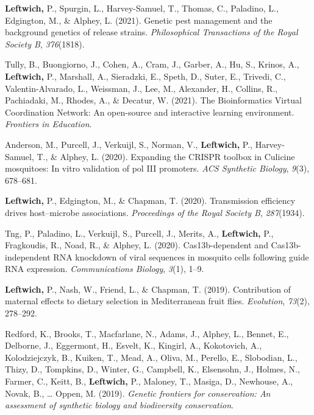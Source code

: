 \documentclass[11pt, a4paper]{awesome-cv}
\begin{document}
\leavevmode\hypertarget{ref-13}{}%
\textbf{Leftwich,} P., Spurgin, L., Harvey-Samuel, T., Thomas, C.,
Paladino, L., Edgington, M., \& Alphey, L. (2021). Genetic pest
management and the background genetics of release strains.
\emph{Philosophical Transactions of the Royal Society B},
\emph{376}(1818).

\leavevmode\hypertarget{ref-20}{}%
Tully, B., Buongiorno, J., Cohen, A., Cram, J., Garber, A., Hu, S.,
Krinos, A., \textbf{Leftwich,} P., Marshall, A., Sieradzki, E., Speth,
D., Suter, E., Trivedi, C., Valentin-Alvarado, L., Weissman, J., Lee,
M., Alexander, H., Collins, R., Pachiadaki, M., Rhodes, A., \& Decatur,
W. (2021). The {Bioinformatics} {Virtual} {Coordination} {Network}: An
open-source and interactive learning environment. \emph{Frontiers in
Education}.

\leavevmode\hypertarget{ref-11}{}%
Anderson, M., Purcell, J., Verkuijl, S., Norman, V., \textbf{Leftwich,}
P., Harvey-Samuel, T., \& Alphey, L. (2020). Expanding the CRISPR
toolbox in {Culicine} mosquitoes: In vitro validation of pol III
promoters. \emph{ACS Synthetic Biology}, \emph{9}(3), 678--681.

\leavevmode\hypertarget{ref-14}{}%
\textbf{Leftwich,} P., Edgington, M., \& Chapman, T. (2020).
Transmission efficiency drives host--microbe associations.
\emph{Proceedings of the Royal Society B}, \emph{287}(1934).

\leavevmode\hypertarget{ref-16}{}%
Tng, P., Paladino, L., Verkuijl, S., Purcell, J., Merits, A.,
\textbf{Leftwich,} P., Fragkoudis, R., Noad, R., \& Alphey, L. (2020).
Cas13b-dependent and {Cas}13b-independent {RNA} knockdown of viral
sequences in mosquito cells following guide {RNA} expression.
\emph{Communications Biology}, \emph{3}(1), 1--9.

\leavevmode\hypertarget{ref-15}{}%
\textbf{Leftwich,} P., Nash, W., Friend, L., \& Chapman, T. (2019).
Contribution of maternal effects to dietary selection in {Mediterranean}
fruit flies. \emph{Evolution}, \emph{73}(2), 278--292.

\leavevmode\hypertarget{ref-6}{}%
Redford, K., Brooks, T., Macfarlane, N., Adams, J., Alphey, L., Bennet,
E., Delborne, J., Eggermont, H., Esvelt, K., Kingirl, A., Kokotovich,
A., Kolodziejczyk, B., Kuiken, T., Mead, A., Oliva, M., Perello, E.,
Slobodian, L., Thizy, D., Tompkins, D., Winter, G., Campbell, K.,
Elsensohn, J., Holmes, N., Farmer, C., Keitt, B., \textbf{Leftwich,} P.,
Maloney, T., Masiga, D., Newhouse, A., Novak, B., \ldots{} Oppen, M.
(2019). \emph{Genetic frontiers for conservation: An assessment of
synthetic biology and biodiversity conservation}.
\end{document}
